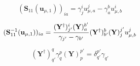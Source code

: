 \begin{subappendices}
    \begin{equation}
        (\mathbf{S}_{11}(\mathbf{u}_{\mu,1}))_{ia}
        =
        \gamma^i_j
        u_{\mu,a}^j
        -
        \gamma^b_a
        u_{\mu,b}^i
    \end{equation}

    \begin{equation}
        (\mathbf{S}_{11}^{-1}(\mathbf{u}_{\mu,1}))_{ia}
        =
        \frac{%
            (\mathbf{Y}^\dagger)_{j'}^i
            (\mathbf{Y})_a^{b'}
        }{%
            \gamma_{j'}-\gamma_{b'}
        }
        (\mathbf{Y}^\dagger)_{b'}^b
        (\mathbf{Y})_j^{j'}
        u_{\mu,b}^j
    \end{equation}

    \begin{equation}
        (\mathbf{Y}^\dagger)_{q'}^q
        \gamma_q^p
        (\mathbf{Y})_p^{p'}
        =
        \delta_{q'}^{p'}
        \gamma_{q'}
    \end{equation}

\end{subappendices}
